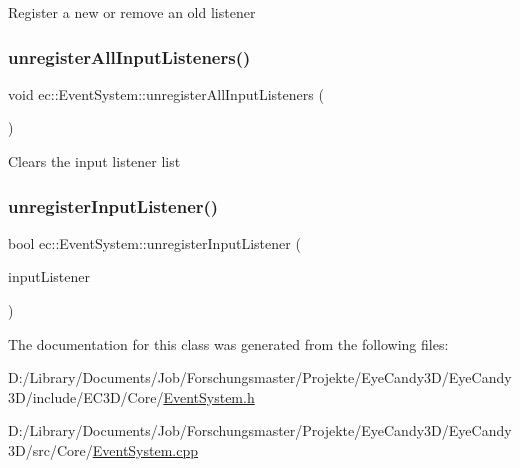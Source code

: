 Register a new or remove an old listener \mbox{\label{classec_1_1_event_system_a142264d74594a6584fd06a00eec45345}} 
\subsubsection{\texorpdfstring{unregister\+All\+Input\+Listeners()}{unregisterAllInputListeners()}}
{\footnotesize\ttfamily void ec\+::\+Event\+System\+::unregister\+All\+Input\+Listeners (\begin{DoxyParamCaption}{ }\end{DoxyParamCaption})}

Clears the input listener list \mbox{\label{classec_1_1_event_system_a6b76350de7e412e8df412b8c5bfd5b03}} 
\subsubsection{\texorpdfstring{unregister\+Input\+Listener()}{unregisterInputListener()}}
{\footnotesize\ttfamily bool ec\+::\+Event\+System\+::unregister\+Input\+Listener (\begin{DoxyParamCaption}\item[{\mbox{\hyperlink{classec_1_1_input_listener}{Input\+Listener}} $\ast$}]{input\+Listener }\end{DoxyParamCaption})}



The documentation for this class was generated from the following files\+:\begin{DoxyCompactItemize}
\item 
D\+:/\+Library/\+Documents/\+Job/\+Forschungsmaster/\+Projekte/\+Eye\+Candy3\+D/\+Eye\+Candy3\+D/include/\+E\+C3\+D/\+Core/\mbox{\hyperlink{_event_system_8h}{Event\+System.\+h}}\item 
D\+:/\+Library/\+Documents/\+Job/\+Forschungsmaster/\+Projekte/\+Eye\+Candy3\+D/\+Eye\+Candy3\+D/src/\+Core/\mbox{\hyperlink{_event_system_8cpp}{Event\+System.\+cpp}}\end{DoxyCompactItemize}
